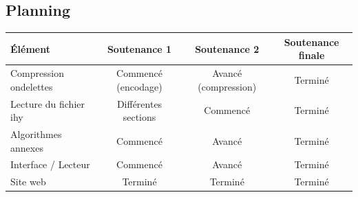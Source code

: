 \documentclass[a4paper,12pt]{article}
\begin{document}
\newpage

\begin{landscape}
	\subsection{Planning}
	\begin{center}
	\begin{tabular}{||l||c|c|c||}
		\hline
		\hline
		Élément & Soutenance 1 & Soutenance 2 & Soutenance finale \\
		\hline
		\hline
		Compression   ondelettes   &   Commencé   (encodage)   &  Avancé
		(compression) & Terminé \\
		\hline
		Lecture  du fichier  ihy &  Différentes  sections  &  Commencé &
		Terminé \\
		\hline
		Algorithmes annexes & Commencé & Avanc\'e & Terminé \\
		\hline
		Interface / Lecteur & Commenc\'e & Avancé & Terminé \\
		\hline
		Site web & Terminé & Terminé & Terminé \\
		\hline
		\hline
	\end{tabular}
	\end{center}
\end{landscape}

\end{document}
